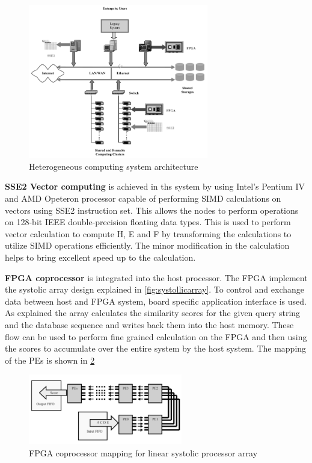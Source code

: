 \documentclass[12pt,twoside]{article}
\begin{document}
\begin{figure}%
    \centering
    \includegraphics[width=0.7\textwidth]{fig/hetero}
    \caption{Heterogeneous computing system architecture \cite[Figure 1]{meng_high-performance_2010}}
    \label{fig:hetero}
\end{figure}

\textbf{SSE2 Vector computing} is achieved in ths system by using Intel's Pentium IV and AMD Opeteron processor capable of performing SIMD calculations
on vectors using SSE2 instruction set. This allows the nodes to perform operations on 128-bit IEEE double-precision floating data types. This is used 
to perform vector calculation to compute H, E and F by transforming the calculations to utilize SIMD operations efficiently. The minor modification in
the calculation helps to bring excellent speed up to the calculation.

\textbf{FPGA coprocessor} is integrated into the host processor. The FPGA implement the systolic array design explained in \cref{fig:systollicarray}.
To control and exchange data between host and FPGA system, board specific application interface is used. As explained the array calculates the 
similarity scores for the given query string and the database sequence and writes back them into the host memory. These flow can be used to
perform fine grained calculation on the FPGA and then using the scores to accumulate over the entire system by the host system. The mapping of the 
PEs is shown in \cref{fig:hetrosw}

\begin{figure}%
    \centering
    \includegraphics[width=0.6\textwidth]{fig/hetrosw}
    \caption{FPGA coprocessor mapping for linear systolic processor array \cite[Figure 3]{meng_high-performance_2010}}
    \label{fig:hetrosw}
\end{figure}
\end{document}
